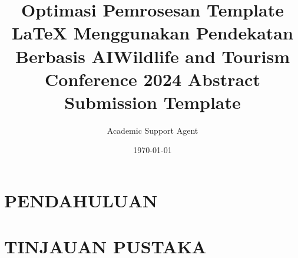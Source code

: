 \documentclass{article}
\title{Optimasi Pemrosesan Template LaTeX Menggunakan Pendekatan Berbasis AI}
\author{Academic Support Agent}
\date{\today}
\begin{document}
\maketitle

\begin{abstract}

\end{abstract}

\chapter{PENDAHULUAN}


\chapter{TINJAUAN PUSTAKA}


\usepackage[utf8]{inputenc}
\usepackage{geometry}
\geometry{a4paper, margin=1in}
\usepackage{setspace}
\usepackage{times}

\title{\textbf{Wildlife and Tourism Conference 2024 Abstract Submission Template}}
\date{}
\end{document}
